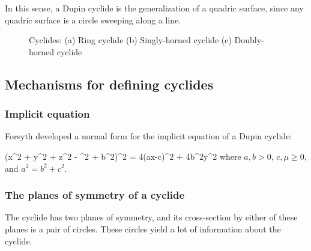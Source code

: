 In this sense, a Dupin cyclide is the generalization of a quadric surface,
since any quadric surface is a circle sweeping along a line.


\begin{figure}
\vspace{2in}
\caption{Cyclides: (a) Ring cyclide (b) Singly-horned cyclide 
		(c) Doubly-horned cyclide}
\label{cyc-pic}
\end{figure}

\subsection{Mechanisms for defining cyclides}

\subsubsection{Implicit equation}

Forsyth \cite{F12} 
developed a normal form for the implicit equation of a Dupin cyclide:

\be
\label{eqcy}
(x^{2} + y^{2} + z^{2} - \mu^{2} + b^{2})^{2} = 4(ax-c\mu)^{2} + 4b^{2}y^{2}
\ee
where $a,b > 0$, $c,\mu \geq 0$, and $a^{2} = b^{2} + c^{2}$.


\subsubsection{The planes of symmetry of a cyclide}

The cyclide has two planes of symmetry, and its cross-section
by either of these planes is a pair of circles.
These circles yield a lot of information about the cyclide.

